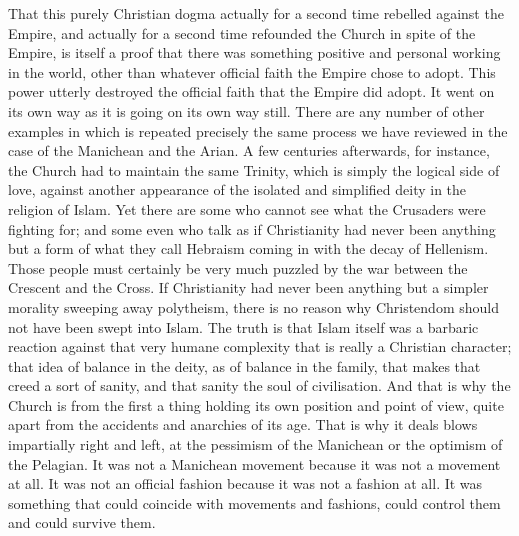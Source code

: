 That this purely Christian dogma actually for a second time rebelled against the Empire, and actually for a second time refounded the Church in spite of the Empire, is itself a proof that there was something positive and personal working in the world, other than whatever official faith the Empire chose to adopt. This power utterly destroyed the official faith that the Empire did adopt. It went on its own way as it is going on its own way still. There are any number of other examples in which is repeated precisely the same process we have reviewed in the case of the Manichean and the Arian. A few centuries afterwards, for instance, the Church had to maintain the same Trinity, which is simply the logical side of love, against another appearance of the isolated and simplified deity in the religion of Islam. Yet there are some who cannot see what the Crusaders were fighting for; and some even who talk as if Christianity had never been anything but a form of what they call Hebraism coming in with the decay of Hellenism. Those people must certainly be very much puzzled by the war between the Crescent and the Cross. If Christianity had never been anything but a simpler morality sweeping away polytheism, there is no reason why Christendom should not have been swept into Islam. The truth is that Islam itself was a barbaric reaction against that very humane complexity that is really a Christian character; that idea of balance in the deity, as of balance in the family, that makes that creed a sort of sanity, and that sanity the soul of civilisation. And that is why the Church is from the first a thing holding its own position and point of view, quite apart from the accidents and anarchies of its age. That is why it deals blows impartially right and left, at the pessimism of the Manichean or the optimism of the Pelagian. It was not a Manichean movement because it was not a movement at all. It was not an official fashion because it was not a fashion at all. It was something that could coincide with movements and fashions, could control them and could survive them.


